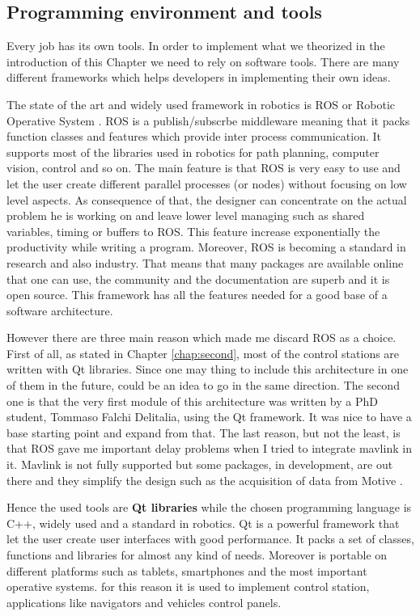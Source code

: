 \subsection{Programming environment and tools}

Every job has its own tools. In order to implement what we theorized in the introduction of this Chapter we need to rely on software tools. There are many different frameworks which helps developers in implementing their own ideas.

 The state of the art and widely used framework in robotics is ROS or Robotic Operative System \cite{ROS}. ROS is a publish/subscrbe middleware meaning that it packs function classes and features which provide inter process communication. It supports most of the libraries used in robotics for path planning, computer vision, control and so on. The main feature is that ROS is very easy to use and let the user create different parallel processes (or nodes) without focusing on low level aspects. As consequence of that, the designer can concentrate on the actual problem he is working on and leave lower level managing such as shared variables, timing or buffers to ROS. This feature increase exponentially the productivity while writing a program. Moreover, ROS is becoming a standard in research and also industry. That means that many packages are available online that one can use, the community and the documentation are superb and it is open source. This framework has all the features needed for a good base of a software architecture.
 
 However there are three main reason which made me discard ROS as a choice. First of all, as stated in Chapter \ref{chap:second}, most of the control stations are written with Qt libraries. Since one may thing to include this architecture in one of them in the future, could be an idea to go in the same direction. The second one is that the very first module of this architecture was written by a PhD student, Tommaso Falchi Delitalia, using the Qt framework. It was nice to have a base starting point and expand from that. The last reason, but not the least, is that ROS gave me important delay problems when I tried to integrate mavlink in it. Mavlink is not fully supported but some packages, in development, are out there and they simplify the design such as the acquisition of data from Motive \cite{optiros}.

Hence the used tools are \textbf{Qt libraries} \cite{qt} while the chosen programming language is C++, widely used and a standard in robotics. Qt is a powerful framework that let the user create user interfaces with good performance. It packs a set of classes, functions and libraries for almost any kind of needs. Moreover is portable on different platforms such as tablets, smartphones and the most important operative systems. for this reason it is used to implement control station, applications like navigators and vehicles control panels.

